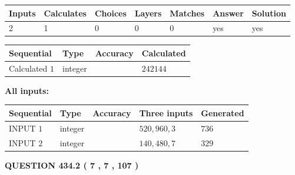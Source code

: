 \documentclass{ctexart}
\begin{document}
 
\noindent{}
 
 

 
   
   
   
   
\noindent\begin{tabular}{|l|l|l|l|l|l|l|}
 \hline
Inputs & Calculates & Choices & Layers & Matches & Answer & Solution \\ \hline
 2  & 
 1  & 
 0
  & 
 0  & 
 0  & 
  yes & 
  yes 
  \\ \hline
 \end{tabular}
   
   
   
   
\noindent{}
   
   
  
  
\noindent\begin{tabular}{|l|l|l|l|}
\hline
 Sequential & Type & Accuracy & Calculated \\ 
\hline
 
 
  Calculated $  1 $ & integer &  & 
  $ 242144 $ 
 \\  \hline  
 \end{tabular}
   
   
   
   
\noindent\vspace{0.1in}\hspace{-0.08in} {\textbf{\Large{All inputs: }}}
   
   
  
  
\noindent\begin{tabular}{|l|l|l|l|l|}
\hline
 Sequential & Type & Accuracy & Three inputs & Generated \\ 
\hline
 
 
  INPUT $  1 $ & integer &  & $
 520
 , 
 960
 , 
 3
 $ & $ 736 $ 
 \\  \hline  
 
 
  INPUT $  2 $ & integer &  & $
 140
 , 
 480
 , 
 7
 $ & $ 329 $ 
 \\  \hline  
 \end{tabular}
   
   
  
\vspace{0.2in}
  
{\textbf{\Large{QUESTION
434.2 
 ( 7 , 7 , 107 )
}}}
  
  
 
\end{document}
